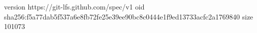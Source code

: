 version https://git-lfs.github.com/spec/v1
oid sha256:f5a77dab5f537a6e8fb72fe25e39ee90bc8c0444e1f9ed13733acfc2a1769840
size 101073
